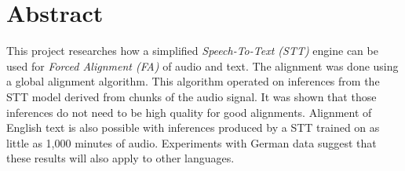 \section*{Abstract}

This project researches how a simplified \textit{Speech-To-Text (STT)} engine can be used for \textit{Forced Alignment (FA)} of audio and text. The alignment was done using a global alignment algorithm. This algorithm operated on inferences from the STT model derived from chunks of the audio signal. It was shown that those inferences do not need to be high quality for good alignments. Alignment of English text is also possible with inferences produced by a STT trained on as little as 1,000 minutes of audio. Experiments with German data suggest that these results will also apply to other languages.